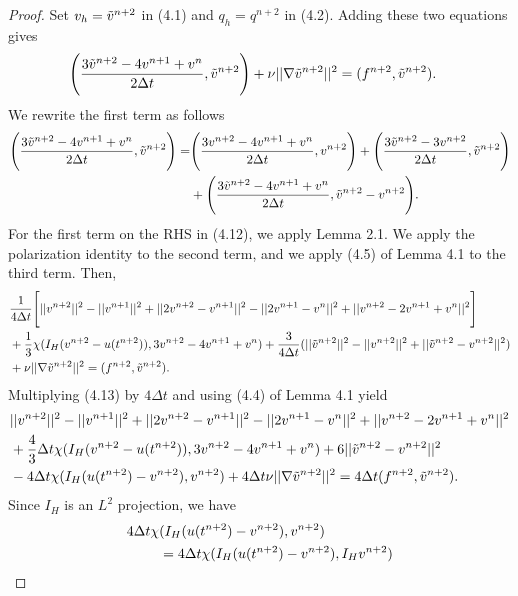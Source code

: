 \documentclass[11pt,a4paper]{article}
\begin{document}
\begin{proof}
    Set $v_h=\Tilde{v}^{n+2}$ in (4.1) and $q_h=q^{n+2}$ in (4.2). Adding these two equations gives
    \begin{align}
        &\Bigg(\frac{3\Tilde{v}^{n+2}-4v^{n+1}+v^n}{2\Delta t}, \Tilde{v}^{n+2}\Bigg) + \nu ||\nabla \Tilde{v}^{n+2}||^2 =(f^{n+2},\Tilde{v}^{n+2}).
    \end{align}
    We rewrite the first term as follows
    \begin{align}
        \Bigg(\frac{3\Tilde{v}^{n+2}-4v^{n+1}+v^n}{2\Delta t}, \Tilde{v}^{n+2}\Bigg)=
        &\Bigg(\frac{3v^{n+2}-4v^{n+1}+v^n}{2\Delta t}, v^{n+2}\Bigg) +\Bigg(\frac{3\Tilde{v}^{n+2}-3v^{n+2}}{2\Delta t}, \Tilde{v}^{n+2}\Bigg) \notag \\
        &+\Bigg(\frac{3\Tilde{v}^{n+2}-4v^{n+1}+v^n}{2\Delta t}, \Tilde{v}^{n+2}-v^{n+2}\Bigg).
    \end{align}
    For the first term on the RHS in (4.12), we apply Lemma 2.1. We apply the polarization identity to the second term, and we apply (4.5) of Lemma 4.1 to the third term. Then,
    \begin{align}
        &\frac{1}{4\Delta t}\Bigg[||v^{n+2}||^2-||v^{n+1}||^2+||2v^{n+2}-v^{n+1}||^2-||2v^{n+1}-v^n||^2+||v^{n+2}-2v^{n+1}+v^n||^2\Bigg] \notag \\
        &+ \frac{1}{3}\chi(I_H(v^{n+2}-u(t^{n+2})),3v^{n+2}-4v^{n+1}+v^n)+\frac{3}{4\Delta t}(||\Tilde{v}^{n+2}||^2-||v^{n+2}||^2+||\Tilde{v}^{n+2}-v^{n+2}||^2) \notag \\
        &+\nu ||\nabla \Tilde{v}^{n+2}||^2=(f^{n+2},\Tilde{v}^{n+2}). 
    \end{align}
    Multiplying (4.13) by $4\Delta t$ and using (4.4) of Lemma 4.1 yield
    \begin{align}
        &||v^{n+2}||^2-||v^{n+1}||^2+||2v^{n+2}-v^{n+1}||^2-||2v^{n+1}-v^n||^2+||v^{n+2}-2v^{n+1}+v^n||^2 \notag \\
        &+ \frac{4}{3}\Delta t\chi(I_H(v^{n+2}-u(t^{n+2})),3v^{n+2}-4v^{n+1}+v^n)+6||\Tilde{v}^{n+2}-v^{n+2}||^2  \\
        &-4\Delta t\chi(I_H(u(t^{n+2})-v^{n+2}),v^{n+2})+4\Delta t\nu ||\nabla \Tilde{v}^{n+2}||^2=4\Delta t(f^{n+2},\Tilde{v}^{n+2}). \notag
    \end{align}
    Since $I_H$ is an $L^2$ projection, we have
    \begin{align}
        4\Delta t\chi &(I_H(u(t^{n+2})-v^{n+2}),v^{n+2}) \notag \\
        &=4\Delta t\chi(I_H(u(t^{n+2})-v^{n+2}),I_Hv^{n+2})\notag \\

\end{align}
\end{proof}
\end{document}
